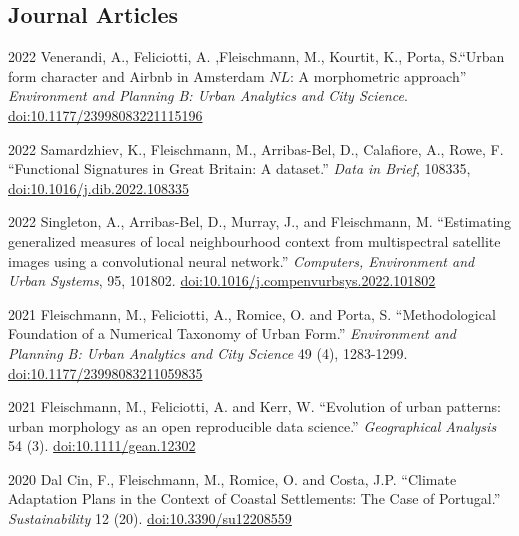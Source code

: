 \documentclass[12pt,a4paper]{report}
\begin{document}
    \subsection*{Journal Articles}

    \begin{tablist}

        \item[2022] \tab{}Venerandi, A., Feliciotti, A. ,Fleischmann, M., Kourtit, K., Porta, S.\enquote{Urban form character and Airbnb in Amsterdam \(NL\): A morphometric approach} \textit{Environment and Planning B: Urban Analytics and City Science}. \href{https://doi.org/10.1177/23998083221115196}{doi:10.1177/23998083221115196}

        \item[2022] \tab{}Samardzhiev, K., Fleischmann, M., Arribas-Bel, D., Calafiore, A., Rowe, F. \enquote{Functional Signatures in Great Britain: A dataset.} \textit{Data in Brief}, 108335, \href{https://doi.org/10.1016/j.dib.2022.108335}{doi:10.1016/j.dib.2022.108335}

        \item[2022] \tab{}Singleton, A., Arribas-Bel, D., Murray, J., and Fleischmann, M. \enquote{Estimating generalized measures of local neighbourhood context from multispectral satellite images using a convolutional neural network.} \textit{Computers, Environment and Urban Systems}, 95, 101802. \href{https://doi.org/10.1016/j.compenvurbsys.2022.101802}{doi:10.1016/j.compenvurbsys.2022.101802}

        \item[2021] \tab{}Fleischmann, M., Feliciotti, A., Romice, O. and Porta, S. \enquote{Methodological Foundation of a Numerical Taxonomy of Urban Form.} \textit{Environment and Planning B: Urban Analytics and City Science} 49 (4), 1283-1299. \href{https://doi.org/10.1177/23998083211059835}{doi:10.1177/23998083211059835}

        \item[2021] \tab{}Fleischmann, M., Feliciotti, A. and Kerr, W. \enquote{Evolution of urban patterns: urban morphology as an open reproducible data science.} \textit{Geographical Analysis} 54 (3). \href{https://doi.org/10.1111/gean.12302}{doi:10.1111/gean.12302}

        \item[2020] \tab{}Dal Cin, F., Fleischmann, M., Romice, O. and Costa, J.P. \enquote{Climate Adaptation Plans in the Context of Coastal Settlements: The Case of Portugal.} \textit{Sustainability} 12 (20). \href{https://doi.org/10.3390/su12208559}{doi:10.3390/su12208559}


\end{tablist}
\end{document}
